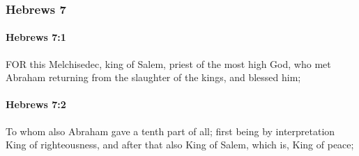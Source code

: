 	\subsubsection{Hebrews 7} %
		\label{HEBREWS-7}
		
		\paragraph{Hebrews 7:1} %
			\label{HEBREWS-7-1}

			FOR this Melchisedec, king of Salem, priest of the most high God, who met Abraham returning from the slaughter of the kings, and blessed him;

			\begin{framed}
			\scriptsize
				\begin{compactdesc}
					\item[SBLG] 
				\end{compactdesc}
			\end{framed}

		\paragraph{Hebrews 7:2} %
			\label{HEBREWS-7-2}

			To whom also Abraham gave a tenth part of all; first being by interpretation King of righteousness, and after that also King of Salem, which is, King of peace;

